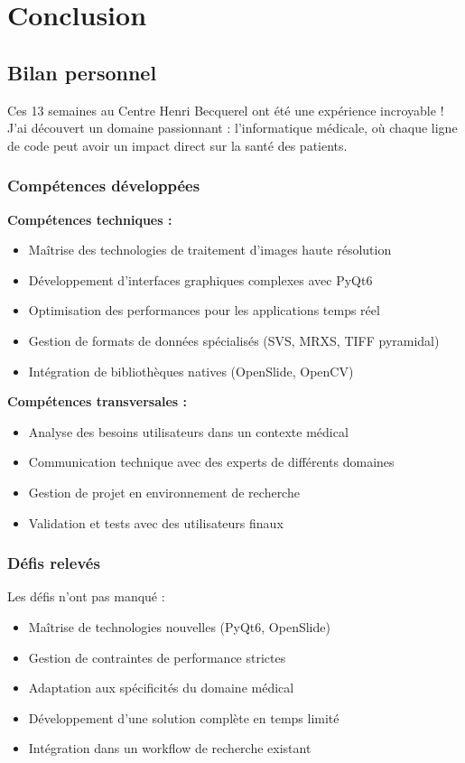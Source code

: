 \documentclass[11pt,a4paper]{report}
\begin{document}
\chapter{Conclusion}

\section{Bilan personnel}

Ces 13 semaines au Centre Henri Becquerel ont été une expérience incroyable ! J'ai découvert un domaine passionnant : l'informatique médicale, où chaque ligne de code peut avoir un impact direct sur la santé des patients.

\subsection{Compétences développées}

\textbf{Compétences techniques :}
\begin{itemize}
\item Maîtrise des technologies de traitement d'images haute résolution
\item Développement d'interfaces graphiques complexes avec PyQt6
\item Optimisation des performances pour les applications temps réel
\item Gestion de formats de données spécialisés (SVS, MRXS, TIFF pyramidal)
\item Intégration de bibliothèques natives (OpenSlide, OpenCV)
\end{itemize}

\textbf{Compétences transversales :}
\begin{itemize}
\item Analyse des besoins utilisateurs dans un contexte médical
\item Communication technique avec des experts de différents domaines
\item Gestion de projet en environnement de recherche
\item Validation et tests avec des utilisateurs finaux
\end{itemize}

\subsection{Défis relevés}

Les défis n'ont pas manqué :

\begin{itemize}
\item Maîtrise de technologies nouvelles (PyQt6, OpenSlide)
\item Gestion de contraintes de performance strictes
\item Adaptation aux spécificités du domaine médical
\item Développement d'une solution complète en temps limité
\item Intégration dans un workflow de recherche existant
\end{itemize}
\end{document}

